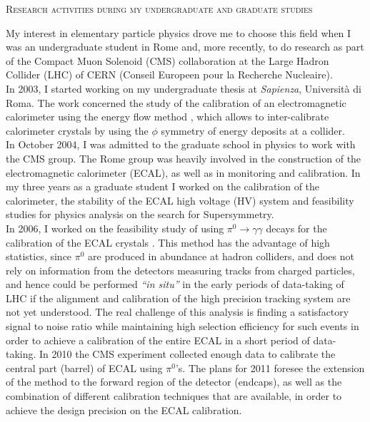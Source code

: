 \documentclass[10pt, a4paper]{article}
\begin{document}
\begin{center} \textsc{Research activities during my undergraduate and graduate studies} \\ \end{center} 

My interest in elementary particle physics drove me to choose this field when I was an undergraduate student in Rome 
and, more recently, to do research as part of the Compact Muon Solenoid (CMS) collaboration at the Large Hadron Collider (LHC) 
of CERN (Conseil Europeen pour la Recherche Nucleaire). \\

In 2003, I started working on my undergraduate thesis at \textit{Sapienza}, Universit\`a di Roma. The work concerned the 
study of the calibration of an electromagnetic calorimeter using the energy flow method \cite{Santanastasio:LAUREA}, which allows to inter-calibrate 
calorimeter crystals by using the $\phi$ symmetry of energy deposits at a collider. \\

In October 2004, I was admitted to the graduate school in physics to work with the CMS group. 
The Rome group was heavily involved in the construction of the electromagnetic calorimeter (ECAL), 
as well as in monitoring and calibration. In my three years as a graduate student I worked on the calibration of 
the calorimeter, the stability of the ECAL high voltage (HV) system and feasibility studies for physics analysis on the search for Supersymmetry. \\


In 2006, I worked on the feasibility study of using $\pi^0 \rightarrow \gamma\gamma$ decays for the calibration 
of the ECAL crystals \cite{DN-2007-013,IN-2006-050}. This method has the advantage of high 
statistics, since $\pi^0$ are produced in abundance at hadron colliders, and does not rely on information from 
the detectors measuring tracks from charged particles, and hence could be performed {\it ``in situ''} in the early 
periods of data-taking of LHC if the alignment and calibration of the high precision tracking system are not yet understood.
The real challenge of this analysis is finding a satisfactory signal to noise ratio while maintaining high selection efficiency for such events 
in order to achieve a calibration of the entire ECAL in a short period of data-taking.
In 2010 the CMS experiment collected enough data to calibrate the central part (barrel) of ECAL using $\pi^0$'s.
The plans for 2011 foresee the extension of the method to the forward region of the detector (endcaps), 
as well as the combination of different calibration techniques that are available, in order to achieve the design precision 
on the ECAL calibration. \\
\end{document}
